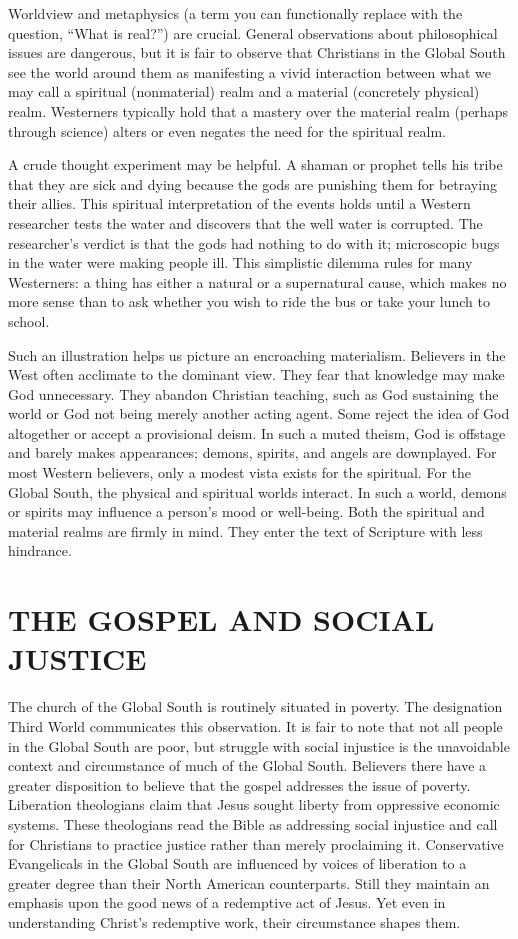Worldview and metaphysics (a term you can functionally replace with the question, “What is real?”)
are crucial. General observations about philosophical issues are dangerous, but it is fair to
observe that Christians in the Global South see the world around them as manifesting a vivid
interaction between what we may call a spiritual (nonmaterial) realm and a material (concretely
physical) realm. Westerners typically hold that a mastery over the material realm (perhaps through
science) alters or even negates the need for the spiritual realm.

A crude thought experiment may be helpful. A shaman or prophet tells his tribe that they are sick
and dying because the gods are punishing them for betraying their allies. This spiritual
interpretation of the events holds until a Western researcher tests the water and discovers that the
well water is corrupted. The researcher’s verdict is that the gods had nothing to do with it;
microscopic bugs in the water were making people ill. This simplistic dilemma rules for many
Westerners: a thing has either a natural or a supernatural cause, which makes no more sense than to
ask whether you wish to ride the bus or take your lunch to school.

Such an illustration helps us picture an encroaching materialism. Believers in the West often
acclimate to the dominant view. They fear that knowledge may make God unnecessary. They abandon
Christian teaching, such as God sustaining the world or God not being merely another acting agent.
Some reject the idea of God altogether or accept a provisional deism. In such a muted theism, God is
offstage and barely makes appearances; demons, spirits, and angels are downplayed. For most Western
believers, only a modest vista exists for the spiritual. For the Global South, the physical and
spiritual worlds interact. In such a world, demons or spirits may influence a person’s mood or
well-being. Both the spiritual and material realms are firmly in mind. They enter the text of
Scripture with less hindrance.

\section{THE GOSPEL AND SOCIAL JUSTICE}

The church of the Global South is routinely situated in poverty. The designation Third World
communicates this observation. It is fair to note that not all people in the Global South are poor,
but struggle with social injustice is the unavoidable context and circumstance of much of the Global
South. Believers there have a greater disposition to believe that the gospel addresses the issue of
poverty. Liberation theologians claim that Jesus sought liberty from oppressive economic systems.
These theologians read the Bible as addressing social injustice and call for Christians to practice
justice rather than merely proclaiming it. Conservative Evangelicals in the Global South are
influenced by voices of liberation to a greater degree than their North American counterparts. Still
they maintain an emphasis upon the good news of a redemptive act of Jesus. Yet even in understanding
Christ’s redemptive work, their circumstance shapes them.

